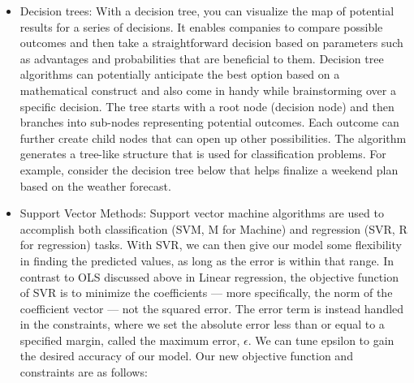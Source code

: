 \documentclass[11pt]{article}
\begin{document}
\begin{itemize}
\item Decision trees: With a decision tree, you can visualize the map of potential results for a series of decisions. It enables companies to compare possible outcomes and then take a straightforward decision based on parameters such as advantages and probabilities that are beneficial to them. Decision tree algorithms can potentially anticipate the best option based on a mathematical construct and also come in handy while brainstorming over a specific decision. The tree starts with a root node (decision node) and then branches into sub-nodes representing potential outcomes. Each outcome can further create child nodes that can open up other possibilities. The algorithm generates a tree-like structure that is used for classification problems. For example, consider the decision tree below that helps finalize a weekend plan based on the weather forecast.
\item Support Vector Methods: Support vector machine algorithms are used to accomplish both classification (SVM, M for Machine) and regression (SVR, R for regression) tasks. 
With SVR, we can then give our model some flexibility in finding the predicted values, as long as the error is within that range.
In contrast to OLS discussed above in Linear regression, 
the objective function of SVR is to minimize the coefficients — more specifically, the norm of the coefficient vector — not the squared error. 
The error term is instead handled in the constraints, where we set the absolute error less than or equal to a specified margin, called the maximum error, $\epsilon$. 
We can tune epsilon to gain the desired accuracy of our model. Our new objective function and constraints are as follows:


\end{itemize}
\end{document}

